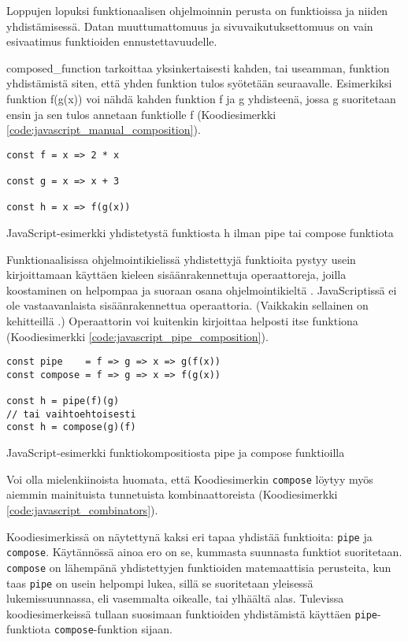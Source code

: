 Loppujen lopuksi funktionaalisen ohjelmoinnin perusta on funktioissa ja niiden yhdistämisessä. Datan muuttumattomuus ja sivuvaikutuksettomuus on vain esivaatimus funktioiden ennustettavuudelle.

\Gls{composed_function} tarkoittaa yksinkertaisesti kahden, tai useamman, funktion yhdistämistä siten, että yhden funktion tulos syötetään seuraavalle. Esimerkiksi funktion f(g(x)) voi nähdä kahden funktion f ja g yhdisteenä, jossa g suoritetaan ensin ja sen tulos annetaan funktiolle f (Koodiesimerkki \ref{code:javascript_manual_composition}).

\begin{code}
    \begin{verbatim}
const f = x => 2 * x

const g = x => x + 3

const h = x => f(g(x))
\end{verbatim}
    \caption{JavaScript-esimerkki yhdistetystä funktiosta h ilman pipe tai compose funktiota}
    \label{code:javascript_manual_composition}
\end{code}

Funktionaalisissa ohjelmointikielissä yhdistettyjä funktioita pystyy usein kirjoittamaan käyttäen kieleen sisäänrakennettuja operaattoreja, joilla koostaminen on helpompaa ja suoraan osana ohjelmointikieltä \cite{fsharpcomposition,haskellcomposition}.
JavaScriptissä ei ole vastaavanlaista sisäänrakennettua operaattoria.
(Vaikkakin sellainen on kehitteillä \cite{tc39_pipeline_operator}.)
Operaattorin voi kuitenkin kirjoittaa helposti itse funktiona (Koodiesimerkki \ref{code:javascript_pipe_composition}).

\begin{code}
    \begin{verbatim}
const pipe    = f => g => x => g(f(x))
const compose = f => g => x => f(g(x))

const h = pipe(f)(g)
// tai vaihtoehtoisesti
const h = compose(g)(f)
\end{verbatim}
    \caption{JavaScript-esimerkki funktiokompositiosta pipe ja compose funktioilla}
    \label{code:javascript_pipe_composition}
\end{code}

Voi olla mielenkiinoista huomata, että Koodiesimerkin \texttt{compose} löytyy myös aiemmin mainituista tunnetuista kombinaattoreista (Koodiesimerkki \ref{code:javascript_combinators}).

Koodiesimerkissä on näytettynä kaksi eri tapaa yhdistää funktioita: \texttt{pipe} ja \texttt{compose}. Käytännössä ainoa ero on se, kummasta suunnasta funktiot suoritetaan. \texttt{compose} on lähempänä yhdistettyjen funktioiden matemaattisia perusteita, kun taas \texttt{pipe} on usein helpompi lukea, sillä se suoritetaan yleisessä lukemissuunnassa, eli vasemmalta oikealle, tai ylhäältä alas. Tulevissa koodiesimerkeissä tullaan suosimaan funktioiden yhdistämistä käyttäen \texttt{pipe}-funktiota \texttt{compose}-funktion sijaan. \citep{whyprefercompose}

